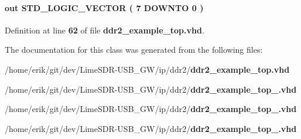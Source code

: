 \paragraph[{test\+\_\+status}]{ {\bfseries \textcolor{keywordflow}{out}\textcolor{vhdlchar}{ }} {\bfseries \textcolor{comment}{S\+T\+D\+\_\+\+L\+O\+G\+I\+C\+\_\+\+V\+E\+C\+T\+OR}\textcolor{vhdlchar}{ }\textcolor{vhdlchar}{(}\textcolor{vhdlchar}{ }\textcolor{vhdlchar}{ } \textcolor{vhdldigit}{7} \textcolor{vhdlchar}{ }\textcolor{keywordflow}{D\+O\+W\+N\+TO}\textcolor{vhdlchar}{ }\textcolor{vhdlchar}{ } \textcolor{vhdldigit}{0} \textcolor{vhdlchar}{ }\textcolor{vhdlchar}{)}\textcolor{vhdlchar}{ }} \hspace{0.3cm}{\ttfamily [Port]}}\label{classddr2__example__top_a65a7437c6740f28b77bc3969eb804463}


Definition at line {\bf 62} of file {\bf ddr2\+\_\+example\+\_\+top.\+vhd}.



The documentation for this class was generated from the following files\+:\begin{DoxyCompactItemize}
\item 
/home/erik/git/dev/\+Lime\+S\+D\+R-\/\+U\+S\+B\+\_\+\+G\+W/ip/ddr2/{\bf ddr2\+\_\+example\+\_\+top.\+vhd}\item 
/home/erik/git/dev/\+Lime\+S\+D\+R-\/\+U\+S\+B\+\_\+\+G\+W/ip/ddr2/{\bf ddr2\+\_\+example\+\_\+top\+\_.\+vhd}\item 
/home/erik/git/dev/\+Lime\+S\+D\+R-\/\+U\+S\+B\+\_\+\+G\+W/ip/ddr2/{\bf ddr2\+\_\+example\+\_\+top\+\_.\+vhd}\item 
/home/erik/git/dev/\+Lime\+S\+D\+R-\/\+U\+S\+B\+\_\+\+G\+W/ip/ddr2/{\bf ddr2\+\_\+example\+\_\+top\+\_.\+vhd}\end{DoxyCompactItemize}
